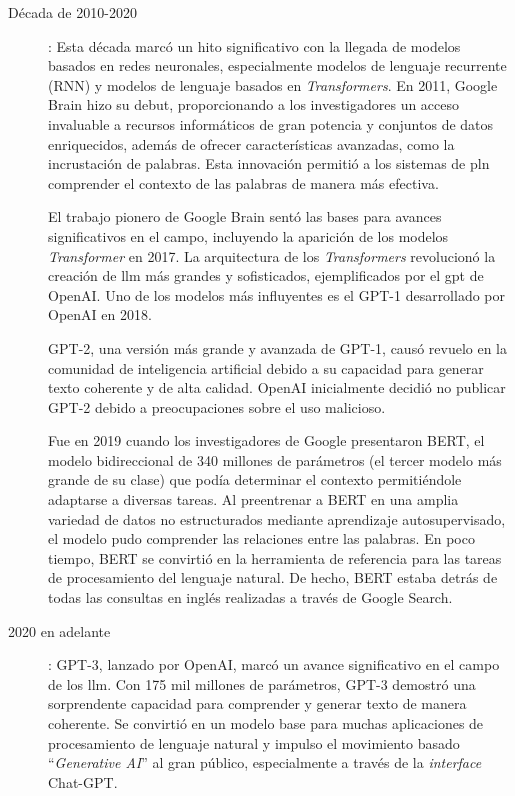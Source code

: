 \begin{description}
\item[Década de 2010-2020]: Esta década marcó un hito significativo con la llegada de modelos basados en redes neuronales, especialmente modelos de lenguaje recurrente (RNN) y modelos de lenguaje basados en \textit{Transformers}. En 2011, Google Brain hizo su debut, proporcionando a los investigadores un acceso invaluable a recursos informáticos de gran potencia y conjuntos de datos enriquecidos, además de ofrecer características avanzadas, como la incrustación de palabras. Esta innovación permitió a los sistemas de \acrlong{pln} comprender el contexto de las palabras de manera más efectiva. 

El trabajo pionero de Google Brain sentó las bases para avances significativos en el campo, incluyendo la aparición de los modelos \textit{Transformer} en 2017. La arquitectura de los \textit{Transformers} revolucionó la creación de \acrfull{llm} más grandes y sofisticados, ejemplificados por el \acrfull{gpt} de OpenAI. Uno de los modelos más influyentes es el GPT-1 desarrollado por OpenAI en 2018.

GPT-2, una versión más grande y avanzada de GPT-1, causó revuelo en la comunidad de inteligencia artificial debido a su capacidad para generar texto coherente y de alta calidad. OpenAI inicialmente decidió no publicar GPT-2 debido a preocupaciones sobre el uso malicioso. 

Fue en 2019 cuando los investigadores de Google presentaron BERT, el modelo bidireccional de 340 millones de parámetros (el tercer modelo más grande de su clase) que podía determinar el contexto permitiéndole adaptarse a diversas tareas. Al preentrenar a BERT en una amplia variedad de datos no estructurados mediante aprendizaje autosupervisado, el modelo pudo comprender las relaciones entre las palabras. En poco tiempo, BERT se convirtió en la herramienta de referencia para las tareas de procesamiento del lenguaje natural. De hecho, BERT estaba detrás de todas las consultas en inglés realizadas a través de Google Search.

\item[2020 en adelante]: GPT-3, lanzado por OpenAI, marcó un avance significativo en el campo de los \acrshort{llm}. Con 175 mil millones de parámetros, GPT-3 demostró una sorprendente capacidad para comprender y generar texto de manera coherente. Se convirtió en un modelo base para muchas aplicaciones de procesamiento de lenguaje natural y impulso el movimiento basado ``\textit{Generative AI}'' al gran público, especialmente a través de la \textit{interface} Chat-GPT.


\end{description}
